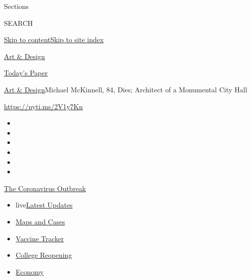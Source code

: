 Sections

SEARCH

\protect\hyperlink{site-content}{Skip to
content}\protect\hyperlink{site-index}{Skip to site index}

\href{https://www.nytimes3xbfgragh.onion/section/arts/design}{Art \&
Design}

\href{https://myaccount.nytimes3xbfgragh.onion/auth/login?response_type=cookie\&client_id=vi}{}

\href{https://www.nytimes3xbfgragh.onion/section/todayspaper}{Today's
Paper}

\href{/section/arts/design}{Art \& Design}\textbar{}Michael McKinnell,
84, Dies; Architect of a Monumental City Hall

\url{https://nyti.ms/2V1y7Kn}

\begin{itemize}
\item
\item
\item
\item
\item
\item
\end{itemize}

\href{https://www.nytimes3xbfgragh.onion/news-event/coronavirus?action=click\&pgtype=Article\&state=default\&region=TOP_BANNER\&context=storylines_menu}{The
Coronavirus Outbreak}

\begin{itemize}
\tightlist
\item
  live\href{https://www.nytimes3xbfgragh.onion/2020/08/04/world/coronavirus-covid-19.html?action=click\&pgtype=Article\&state=default\&region=TOP_BANNER\&context=storylines_menu}{Latest
  Updates}
\item
  \href{https://www.nytimes3xbfgragh.onion/interactive/2020/us/coronavirus-us-cases.html?action=click\&pgtype=Article\&state=default\&region=TOP_BANNER\&context=storylines_menu}{Maps
  and Cases}
\item
  \href{https://www.nytimes3xbfgragh.onion/interactive/2020/science/coronavirus-vaccine-tracker.html?action=click\&pgtype=Article\&state=default\&region=TOP_BANNER\&context=storylines_menu}{Vaccine
  Tracker}
\item
  \href{https://www.nytimes3xbfgragh.onion/2020/08/02/us/covid-college-reopening.html?action=click\&pgtype=Article\&state=default\&region=TOP_BANNER\&context=storylines_menu}{College
  Reopening}
\item
  \href{https://www.nytimes3xbfgragh.onion/live/2020/08/03/business/stock-market-today-coronavirus?action=click\&pgtype=Article\&state=default\&region=TOP_BANNER\&context=storylines_menu}{Economy}
\end{itemize}

